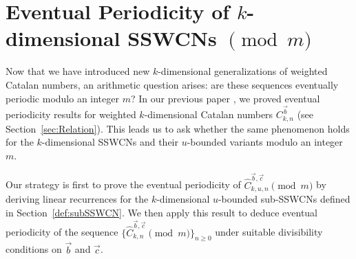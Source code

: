 \documentclass[11pt]{article}
\theoremstyle{remark}
\theoremstyle{definition}
\begin{document}
\section{Eventual Periodicity of \texorpdfstring{$k$}{k}-dimensional SSWCNs \texorpdfstring{$\pmod{m}$}{(mod m)}}\label{sec:periodicity}
Now that we have introduced new $k$-dimensional generalizations of weighted Catalan numbers, an arithmetic question arises: are these sequences eventually periodic modulo an integer $m$? In our previous paper \cite{MR5034574}, we proved eventual periodicity results for weighted $k$-dimensional Catalan numbers $C_{k,n}^{\vec{b}}$ (see Section~\ref{sec:Relation}). This leads us to ask whether the same phenomenon holds for the $k$-dimensional SSWCNs and their $u$-bounded variants modulo an integer $m$.

Our strategy is first to prove the eventual periodicity of $\widehat{C}_{k,u,n}^{\vec{b},\vec{c}} \pmod{m}$ by deriving linear recurrences for the $k$-dimensional $u$-bounded sub-SSWCNs defined in Section~\ref{def:subSSWCN}. We then apply this result to deduce eventual periodicity of the sequence $\{\widehat{C}_{k,n}^{\vec{b},\vec{c}} \pmod{m}\}_{n\geq 0}$ under suitable divisibility conditions on $\vec{b}$ and $\vec{c}$.
\end{document}
